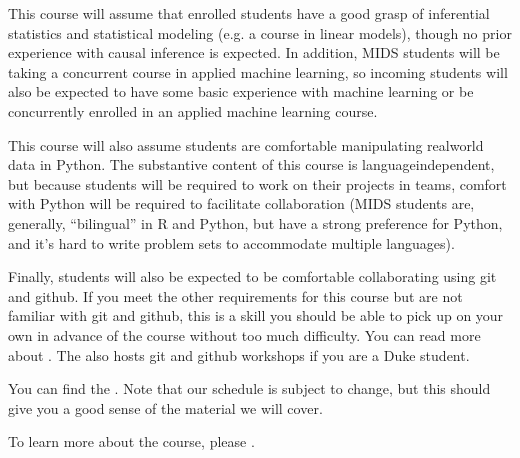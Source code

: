 \documentclass[letterpaper,10pt,english]{jupyterBook}
\begin{document}
\sphinxAtStartPar
This course will assume that enrolled students have a good grasp of inferential statistics and statistical modeling (e.g. a course in linear models), though no prior experience with causal inference is expected. In addition, MIDS students will be taking a concurrent course in applied machine learning, so incoming students will also be expected to have some basic experience with machine learning or be concurrently enrolled in an applied machine learning course.

\sphinxAtStartPar
This course will also assume students are comfortable manipulating real\sphinxhyphen{}world data in Python. The substantive content of this course is language\sphinxhyphen{}independent, but because students will be required to work on their projects in teams, comfort with Python will be required to facilitate collaboration (MIDS students are, generally, “bilingual” in R and Python, but have a strong preference for Python, and it’s hard to write problem sets to accommodate multiple languages).

\sphinxAtStartPar
Finally, students will also be expected to be comfortable collaborating using git and github. If you meet the other requirements for this course but are not familiar with git and github, this is a skill you should be able to pick up on your own in advance of the course without too much difficulty. You can read more about . The  also hosts git and github workshops if you are a Duke student.

\begin{DUlineblock}{0em}
\item[] 
\end{DUlineblock}

\sphinxAtStartPar
You can find the {\hyperref[\detokenize{00_class_schedule/class_schedule::doc}]{}}. Note that our schedule is subject to change, but this should give you a good sense of the material we will cover.

\begin{DUlineblock}{0em}
\item[] 
\end{DUlineblock}

\sphinxAtStartPar
To learn more about the course, please .
\end{document}

